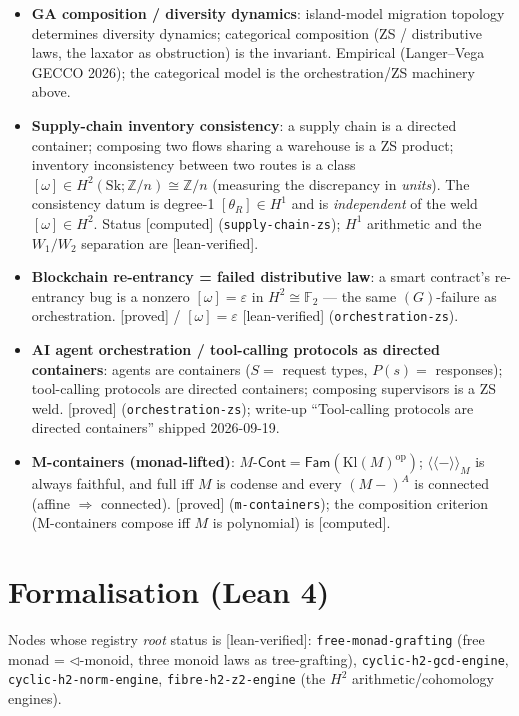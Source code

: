 \documentclass[11pt]{article}
\newcommand{\Cont}{\mathsf{Cont}}
\newcommand{\Fam}{\mathsf{Fam}}
\newcommand{\reg}[1]{\texttt{#1}}
\newcommand{\grade}[1]{\textsf{[#1]}}
\begin{document}
\begin{itemize}[leftmargin=1.2em]
\item \textbf{GA composition / diversity dynamics}: island-model migration topology
determines diversity dynamics; categorical composition (ZS / distributive laws, the
laxator as obstruction) is the invariant. Empirical (Langer--Vega GECCO 2026); the
categorical model is the orchestration/ZS machinery above.
\item \textbf{Supply-chain inventory consistency}: a supply chain is a directed container;
composing two flows sharing a warehouse is a ZS product; inventory inconsistency between
two routes is a class $[\omega]\in H^2(\mathrm{Sk};\mathbb{Z}/n)\cong\mathbb{Z}/n$
(measuring the discrepancy in \emph{units}). The consistency datum is degree-1
$[\theta_R]\in H^1$ and is \emph{independent} of the weld $[\omega]\in H^2$. Status
\grade{computed} (\reg{supply-chain-zs}); $H^1$ arithmetic and the $W_1/W_2$ separation are
\grade{lean-verified}.
\item \textbf{Blockchain re-entrancy = failed distributive law}: a smart contract's
re-entrancy bug is a nonzero $[\omega]=\varepsilon$ in $H^2\cong\mathbb{F}_2$ --- the same
$(G)$-failure as orchestration. \grade{proved} / $[\omega]=\varepsilon$
\grade{lean-verified} (\reg{orchestration-zs}).
\item \textbf{AI agent orchestration / tool-calling protocols as directed containers}:
agents are containers ($S=$ request types, $P(s)=$ responses); tool-calling protocols are
directed containers; composing supervisors is a ZS weld. \grade{proved}
(\reg{orchestration-zs}); write-up ``Tool-calling protocols are directed containers''
shipped 2026-09-19.
\item \textbf{M-containers (monad-lifted)}: $M\text{-}\Cont=\Fam(\mathrm{Kl}(M)^{\mathrm{op}})$;
$\langle\!\langle-\rangle\!\rangle_M$ is always faithful, and full iff $M$ is codense and
every $(M-)^A$ is connected (affine $\Rightarrow$ connected). \grade{proved}
(\reg{m-containers}); the composition criterion (M-containers compose iff $M$ is
polynomial) is \grade{computed}.
\end{itemize}

\section{Formalisation (Lean 4)}\label{sec:lean}

Nodes whose registry \emph{root} status is \grade{lean-verified}:
\reg{free-monad-grafting} (free monad = $\lhd$-monoid, three monoid laws as tree-grafting),
\reg{cyclic-h2-gcd-engine}, \reg{cyclic-h2-norm-engine}, \reg{fibre-h2-z2-engine}
(the $H^2$ arithmetic/cohomology engines).
\end{document}
